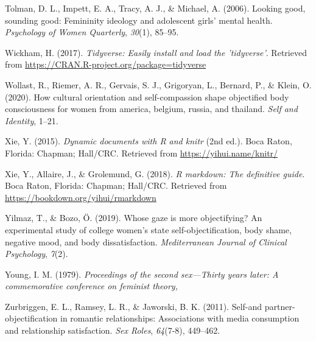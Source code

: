 \documentclass[man]{apa6}
\begin{document}
\hypertarget{ref-tolman2006looking}{}
Tolman, D. L., Impett, E. A., Tracy, A. J., \& Michael, A. (2006).
Looking good, sounding good: Femininity ideology and adolescent girls'
mental health. \emph{Psychology of Women Quarterly}, \emph{30}(1),
85--95.

\hypertarget{ref-R-tidyverse}{}
Wickham, H. (2017). \emph{Tidyverse: Easily install and load the
'tidyverse'}. Retrieved from
\url{https://CRAN.R-project.org/package=tidyverse}

\hypertarget{ref-wollast2020cultural}{}
Wollast, R., Riemer, A. R., Gervais, S. J., Grigoryan, L., Bernard, P.,
\& Klein, O. (2020). How cultural orientation and self-compassion shape
objectified body consciousness for women from america, belgium, russia,
and thailand. \emph{Self and Identity}, 1--21.

\hypertarget{ref-R-knitr}{}
Xie, Y. (2015). \emph{Dynamic documents with R and knitr} (2nd ed.).
Boca Raton, Florida: Chapman; Hall/CRC. Retrieved from
\url{https://yihui.name/knitr/}

\hypertarget{ref-R-rmarkdown}{}
Xie, Y., Allaire, J., \& Grolemund, G. (2018). \emph{R markdown: The
definitive guide}. Boca Raton, Florida: Chapman; Hall/CRC. Retrieved
from \url{https://bookdown.org/yihui/rmarkdown}

\hypertarget{ref-yilmaz2019whose}{}
Yilmaz, T., \& Bozo, Ö. (2019). Whose gaze is more objectifying? An
experimental study of college women's state self-objectification, body
shame, negative mood, and body dissatisfaction. \emph{Mediterranean
Journal of Clinical Psychology}, \emph{7}(2).

\hypertarget{ref-young1979}{}
Young, I. M. (1979). \emph{Proceedings of the second sex---Thirty years
later: A commemorative conference on feminist theory,}

\hypertarget{ref-zurbriggen2011self}{}
Zurbriggen, E. L., Ramsey, L. R., \& Jaworski, B. K. (2011). Self-and
partner-objectification in romantic relationships: Associations with
media consumption and relationship satisfaction. \emph{Sex Roles},
\emph{64}(7-8), 449--462.

\endgroup
\end{document}
